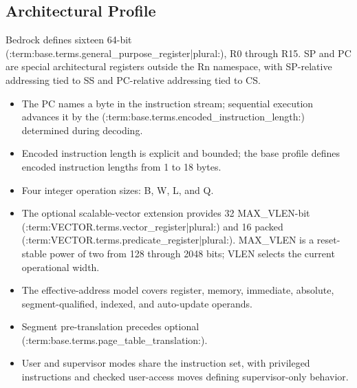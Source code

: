\subsection{Architectural Profile}
Bedrock defines sixteen 64-bit (:term:base.terms.general_purpose_register|plural:), R0 through R15. SP and PC are special architectural registers outside the
Rn namespace, with SP-relative addressing tied to SS and PC-relative addressing tied to CS.

\begin{itemize}
\item The PC names a byte in the instruction stream; sequential execution advances it by the (:term:base.terms.encoded_instruction_length:) determined during decoding.
\item Encoded instruction length is explicit and bounded; the base profile defines encoded instruction lengths from 1 to 18 bytes.
\item Four integer operation sizes: B, W, L, and Q.
\item The optional scalable-vector extension provides 32 MAX\_VLEN-bit (:term:VECTOR.terms.vector_register|plural:) and 16 packed (:term:VECTOR.terms.predicate_register|plural:). MAX\_VLEN is a reset-stable power of two from 128 through 2048 bits; VLEN selects the current operational width.
\item The effective-address model covers register, memory, immediate, absolute, segment-qualified, indexed, and auto-update operands.
\item Segment pre-translation precedes optional (:term:base.terms.page_table_translation:).
\item User and supervisor modes share the instruction set, with privileged instructions and checked user-access moves defining supervisor-only behavior.
\end{itemize}
